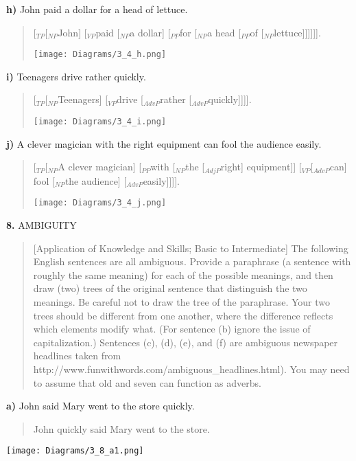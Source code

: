 \documentclass[11pt,notitlepage]{article}
\newcommand{\question}[2]{\textbf{#1.} #2}
\newcommand{\subquestion}[2]{\par\hspace{0.5cm} \textbf{#1)} #2}
\begin{document}
\subquestion{h}{John paid a dollar for a head of lettuce.}

\begin{quote}
[$_{TP}$[$_{NP}$John] [$_{VP}$paid [$_{NP}$a dollar] [$_{PP}$for [$_{NP}$a head [$_{PP}$of [$_{NP}$lettuce]]]]]].

\texttt{[image: Diagrams/3\_4\_h.png]}
\end{quote}

\subquestion{i}{Teenagers drive rather quickly.}

\begin{quote}
[$_{TP}$[$_{NP}$Teenagers] [$_{VP}$drive [$_{AdvP}$rather [$_{AdvP}$quickly]]]].

\texttt{[image: Diagrams/3\_4\_i.png]}
\end{quote}

\subquestion{j}{A clever magician with the right equipment can fool the audience
easily.}

\begin{quote}
[$_{TP}$[$_{NP}$A clever magician] [$_{PP}$with [$_{NP}$the [$_{AdjP}$right] equipment]] [$_{VP}$[$_{AdvP}$can] fool [$_{NP}$the audience] [$_{AdvP}$easily]]]].

\texttt{[image: Diagrams/3\_4\_j.png]}
\end{quote}


\question{8}{AMBIGUITY}
\begin{quote}
[Application of Knowledge and Skills; Basic to Intermediate]
The following English sentences are all ambiguous. Provide a
paraphrase (a sentence with roughly the same meaning) for each of the
possible meanings, and then draw (two) trees of the original sentence
that distinguish the two meanings. Be careful not to draw the tree of
the paraphrase. Your two trees should be different from one another,
where the difference reflects which elements modify what. (For
sentence (b) ignore the issue of capitalization.) Sentences (c), (d),
(e), and (f) are ambiguous newspaper headlines taken from
http://www.fun\-with\-words.com/ambiguous\_headlines.html). You may need
to assume that old and seven can function as adverbs.
\end{quote}

\subquestion{a}{John said Mary went to the store quickly.}

\begin{quote}John quickly said Mary went to the store.\end{quote}

    \texttt{[image: Diagrams/3\_8\_a1.png]}
\end{document}
